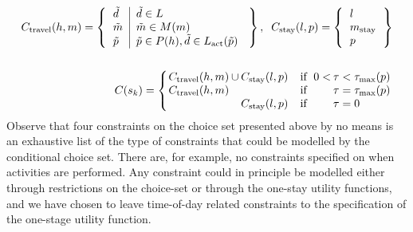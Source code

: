 \begin{subequations}
\begin{align}
    C_\text{travel}(h,m) = 
    \left \{
    {
    \begin{tabular}{l|l}
    	$\act{d}$ & $\act{d} \in  L$                                      \\
    	$\act{m}$ & $\act{m} \in M(m)$                                    \\
    	$\act{p}$ & $\act{p} \in P(h), \act{d} \in L_\text{act}(\act{p})$
    \end{tabular}
  } \right\},\;\; C_\text{stay}(l,p) = 
    \left \{ { \begin{tabular}{l}
    	$l$             \\
    	$m_\text{stay}$ \\
    	$p$
    \end{tabular} } \right\} \\ \nonumber \\
    C(\s{k}) = \left \{
    {\setlength\tabcolsep{1pt}
    \begin{tabular}{lllll}
    	$C_\text{travel}(h,m)$ & $\cup$ & $C_\text{stay}(l,p)$ & \;\; if \;$0<$ & $\tau<\tau_\text{max}(p)$   \\
    	$C_\text{travel}(h,m)$ &        &                      & \;\;  if \;    & $\tau = \tau_\text{max}(p)$ \\
    	                       &        & $C_\text{stay}(l,p)$ & \;\; if \;     & $\tau = 0$
    \end{tabular}
  }
    \right.
\end{align}
\end{subequations}
Observe that four constraints on the choice set presented above by no means is an exhaustive list of the type of constraints that could be modelled by the conditional choice set. There are, for example, no constraints specified on when activities are performed. Any constraint could in principle be modelled either through restrictions on the choice-set or through the one-stay utility functions, and we have chosen to leave time-of-day related constraints to the specification of the one-stage utility function. 
